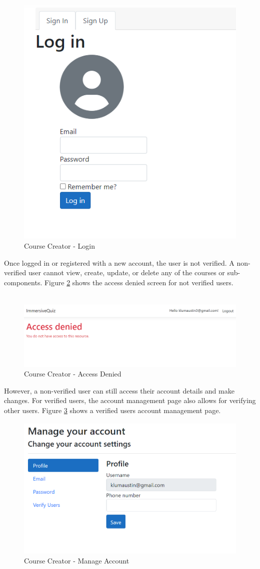 \begin{figure}[htb]
	\centering
	\includegraphics[width=.6\textwidth]{Requirements/assets/cc-login.png}
	\caption[Course Creator - Login]{\label{Course Creator Login}Course Creator - Login}
\end{figure} 
Once logged in or registered with a new account, the user is not verified. A non-verified user cannot view, create, update, or delete any of the courses or sub-components. Figure \ref{CC Denied} shows the access denied screen for not verified users. \\
\\
\begin{figure}[htb]
	\centering
	\includegraphics[width=.6\textwidth]{Requirements/assets/cc-access-denied.png}
	\caption[Course Creator - Access Denied]{\label{CC Denied}Course Creator - Access Denied}
\end{figure}
\clearpage
However, a non-verified user can still access their account details and make changes. For verified users, the account management page also allows for verifying other users. Figure \ref{CC Manage Account} shows a verified users account management page. \\
\begin{figure}[htb]
	\centering
	\includegraphics[width=.6\textwidth]{Requirements/assets/cc-manage-account.png}
	\caption[Course Creator - Manage Account]{\label{CC Manage Account}Course Creator - Manage Account}
\end{figure}
